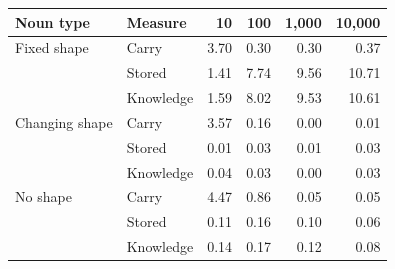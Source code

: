 \begin{tabular}{@{}llrrrr@{}}
\toprule
Noun type & Measure & 10 & 100 & 1,000 & 10,000 \\
\midrule
Fixed shape & Carry & 3.70 & 0.30 & \textminus{}0.30 & \textminus{}0.37 \\
 & Stored & 1.41 & 7.74 & 9.56 & 10.71 \\
 & Knowledge & 1.59 & 8.02 & 9.53 & 10.61 \\
Changing shape & Carry & 3.57 & 0.16 & 0.00 & \textminus{}0.01 \\
 & Stored & 0.01 & \textminus{}0.03 & \textminus{}0.01 & 0.03 \\
 & Knowledge & 0.04 & \textminus{}0.03 & \textminus{}0.00 & 0.03 \\
No shape & Carry & 4.47 & 0.86 & 0.05 & \textminus{}0.05 \\
 & Stored & 0.11 & \textminus{}0.16 & 0.10 & 0.06 \\
 & Knowledge & \textminus{}0.14 & \textminus{}0.17 & 0.12 & 0.08 \\
\bottomrule
\end{tabular}
